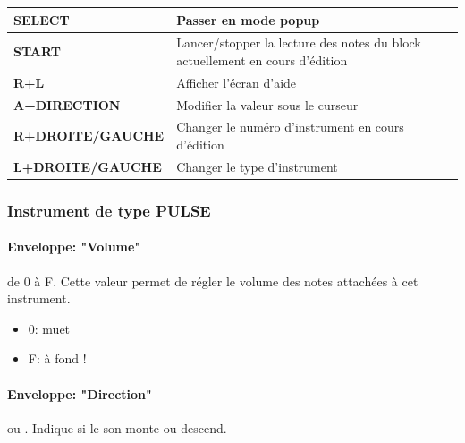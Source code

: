 \documentclass[12pt,a4paper]{article}
\begin{document}
        \tablelasttail{\hline}
        \begin{supertabular}{|l|p{11cm}|}
        \hline
            {\bf SELECT} & Passer en mode popup \\
            \hline
            {\bf START} & Lancer/stopper la lecture des notes du block actuellement en cours d'édition \\
            \hline
            {\bf R+L} & Afficher l'écran d'aide \\
            \hline
            {\bf A+DIRECTION} & Modifier la valeur sous le curseur \\
            \hline
            {\bf R+DROITE/GAUCHE} & Changer le numéro d'instrument en cours d'édition \\
            \hline
            {\bf L+DROITE/GAUCHE} & Changer le type d'instrument \\
        \hline
        \end{supertabular}

        \subsubsection{Instrument de type PULSE}


            \paragraph{Enveloppe: "Volume"} de 0 à F. Cette valeur permet de régler le volume des notes attachées à cet instrument.
            \begin{itemize}
                \item{0: muet}
                \item{F: à fond !}
            \end{itemize}

            \paragraph{Enveloppe: "Direction"}  ou .
            Indique si le son monte ou descend.
\end{document}

